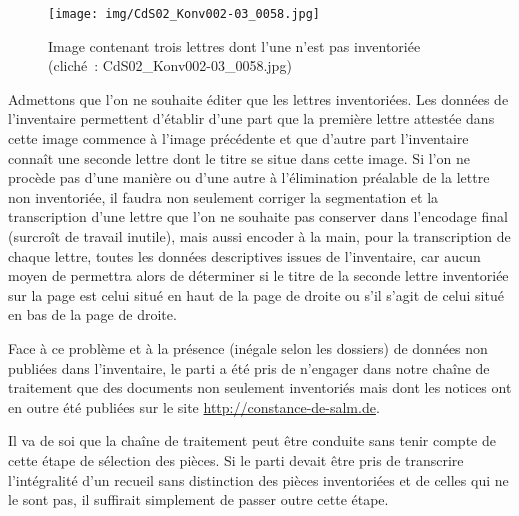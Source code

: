 \documentclass[a4paper,12pt,twoside]{book}
\begin{document}
				\begin{figure}[!h]
					\centering
					\texttt{[image: img/CdS02\_Konv002-03\_0058.jpg]}
					\caption{Image contenant trois lettres dont l'une n'est pas inventoriée (cliché~: CdS02\_Konv002-03\_0058.jpg)}
					\label{non-invent-58}
				\end{figure}
				
				Admettons que l'on ne souhaite éditer que les lettres inventoriées. Les données de l'inventaire permettent d'établir d'une part que la première lettre attestée dans cette image commence à l'image précédente et que d'autre part l'inventaire connaît une seconde lettre dont le titre se situe dans cette image. Si l'on ne procède pas d'une manière ou d'une autre à l'élimination préalable de la lettre non inventoriée, il faudra non seulement corriger la segmentation et la transcription d'une lettre que l'on ne souhaite pas conserver dans l'encodage final (surcroît de travail inutile), mais aussi encoder à la main, pour la transcription de chaque lettre, toutes les données descriptives issues de l'inventaire, car aucun moyen de permettra alors de déterminer si le titre de la seconde lettre inventoriée sur la page est celui situé en haut de la page de droite ou s'il s'agit de celui situé en bas de la page de droite.
						
				Face à ce problème et à la présence (inégale selon les dossiers) de données non publiées dans l'inventaire, le parti a été pris de n'engager dans notre chaîne de traitement que des documents non seulement inventoriés mais dont les notices ont en outre été publiées sur le site \url{http://constance-de-salm.de}.
				
				Il va de soi que la chaîne de traitement peut être conduite sans tenir compte de cette étape de sélection des pièces. Si le parti devait être pris de transcrire l'intégralité d'un recueil sans distinction des pièces inventoriées et de celles qui ne le sont pas, il suffirait simplement de passer outre cette étape.
				
\end{document}

